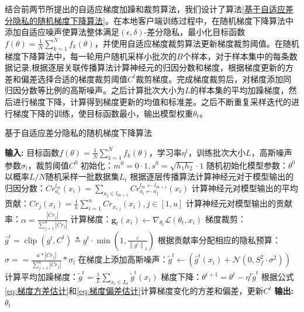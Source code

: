 结合前两节所提出的自适应梯度加躁和裁剪算法，我们设计了算法\ref{基于自适应差分隐私的随机梯度下降算法}。在本地客户端训练过程中，在随机梯度下降算法中添加自适应噪声使算法整体满足$(\epsilon, \delta)$-差分隐私，最小化目标函数$f(\theta)=\frac{1}{N} \sum_{k=1}^{N} f_{k}(\theta)$，并使用自适应梯度裁剪算法更新梯度裁剪阈值。在随机梯度下降算法中，每一轮用户随机采样小批次的$B$个样本，对于样本集中的每条数据记录,根据逐层关联传播算法计算神经元的归因分数和梯度，根据梯度更新的方差和偏差选择合适的梯度裁剪阈值$C^{t}$裁剪梯度。完成梯度裁剪后，对梯度添加同归因分数等比例的高斯噪声。之后计算批次大小为$L$的样本集的平均加躁梯度，然后进行梯度下降，计算得到梯度更新的均值和标准差。之后不断重复采样迭代的进行梯度下降的训练，使目标函数最小，输出模型权重$\theta_{t}$。
\begin{algorithm}[!htb]
	\caption{基于自适应差分隐私的随机梯度下降算法}
	\label{基于自适应差分隐私的随机梯度下降算法}
	\begin{algorithmic}[1]
		\footnotesize
		\STATE \textbf{输入:} 目标函数$f(\theta)=\frac{1}{N} \sum_{k=1}^{N} f_{k}(\theta)$，学习率$\eta^{t}$，训练批次大小$L$，高斯噪声参数$\sigma_{l}$，裁剪阈值$C^{0}$
		\STATE 初始化：$m^{0}=0 \cdot 1, s^{0}=\sqrt{h_{1} h_{2}} \cdot 1$
		\STATE 随机初始化模型参数：$\theta^{0}$
			\STATE 以概率$L / N$随机采样一批数据集$L_{t}$
				\STATE 根据逐层传播算法计算神经元对于模型输出的归因分数：$Cr_{a_{i}}^{l_{m}}\left(x_{i}\right)=\sum_{a_{j} \in l_{m+1}} Cr_{a_{i} \leftarrow a_{j}}^{l_{m} \leftarrow l_{m+1}}\left(x_{i}\right)$
				\STATE 计算神经元对模型输出的平均贡献：$Cr_{j}\left(x_{i}\right)=\frac{1}{n} \sum_{i=1}^{n} Cr_{x_{i, j}}\left(x_{i}\right), j \in[1, u]$
				\STATE 计算神经元对模型输出的贡献率：$\alpha=\frac{\left|\ddot{Cr}_{j}\right|}{\sum_{j=1}^{u}\left|\ddot{Cr}_{j}\right|}$
				\STATE 计算梯度：$\mathbf{g}_{t}\left(x_{i}\right) \leftarrow \nabla_{\theta_{t}} \mathcal{L}\left(\theta_{t}, x_{i}\right)$
				\STATE 梯度裁剪：$\hat{g}^{t}=\operatorname{clip}\left(g^{t}, C^{t}\right) \triangleq g^{t} \cdot \min \left(1, \frac{c}{\left\|g^{t}\right\|_{2}}\right)$
				\STATE 根据贡献率分配相应的隐私预算：$\sigma==\frac{u *\left|\ddot{Cr}_{j}\right|}{\sum_{j=1}^{u}\left|\ddot{Cr}_{j}\right|} * \sigma_{l}$
				\STATE 在梯度上添加高斯噪声：$\tilde{g}^{t}\leftarrow \left(\hat{g}^{t}\left(x_{i}\right)+\mathcal{N}\left(0, S_{f}^{2} \cdot \sigma^{2}\right)\right)$
			\ENDFOR
			\STATE 计算平均加躁梯度：$\tilde{g}^{t}=\frac{1}{L} \sum_{x_{i} \in L_{t}} \tilde{g}^{t}(x_{i})$
			\STATE 梯度下降：$\theta^{t+1}=\theta^{t}-\eta^{t} \tilde{g}^{t}$
			\STATE 根据公式\ref{eq:梯度方差估计}和\ref{eq:梯度偏差估计}计算梯度变化的方差和偏差，更新$C^{t}$
		\ENDFOR
		\STATE \textbf{输出:} $\theta_{t}$
	\end{algorithmic}
\end{algorithm}

